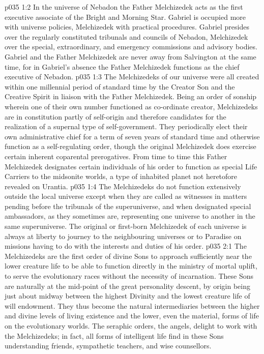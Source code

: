 \vs p035 1:2 In the universe of Nebadon the Father Melchizedek acts as the first executive associate of the Bright and Morning Star. Gabriel is occupied more with universe policies, Melchizedek with practical procedures. Gabriel presides over the regularly constituted tribunals and councils of Nebadon, Melchizedek over the special, extraordinary, and emergency commissions and advisory bodies. Gabriel and the Father Melchizedek are never away from Salvington at the same time, for in Gabriel’s absence the Father Melchizedek functions as the chief executive of Nebadon.
\vs p035 1:3 The Melchizedeks of our universe were all created within one millennial period of standard time by the Creator Son and the Creative Spirit in liaison with the Father Melchizedek. Being an order of sonship wherein one of their own number functioned as co\hyp{}ordinate creator, Melchizedeks are in constitution partly of self\hyp{}origin and therefore candidates for the realization of a supernal type of self\hyp{}government. They periodically elect their own administrative chief for a term of seven years of standard time and otherwise function as a self\hyp{}regulating order, though the original Melchizedek does exercise certain inherent coparental prerogatives. From time to time this Father Melchizedek designates certain individuals of his order to function as special Life Carriers to the midsonite worlds, a type of inhabited planet not heretofore revealed on Urantia.
\vs p035 1:4 The Melchizedeks do not function extensively outside the local universe except when they are called as witnesses in matters pending before the tribunals of the superuniverse, and when designated special ambassadors, as they sometimes are, representing one universe to another in the same superuniverse. The original or first\hyp{}born Melchizedek of each universe is always at liberty to journey to the neighbouring universes or to Paradise on missions having to do with the interests and duties of his order.
\vs p035 2:1 The Melchizedeks are the first order of divine Sons to approach sufficiently near the lower creature life to be able to function directly in the ministry of mortal uplift, to serve the evolutionary races without the necessity of incarnation. These Sons are naturally at the mid\hyp{}point of the great personality descent, by origin being just about midway between the highest Divinity and the lowest creature life of will endowment. They thus become the natural intermediaries between the higher and divine levels of living existence and the lower, even the material, forms of life on the evolutionary worlds. The seraphic orders, the angels, delight to work with the Melchizedeks; in fact, all forms of intelligent life find in these Sons understanding friends, sympathetic teachers, and wise counsellors.
